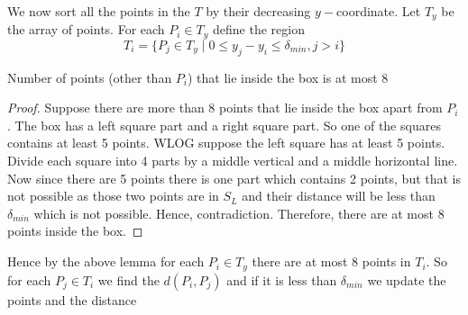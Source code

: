 We now sort all the points in the $T$ by their decreasing $y-$coordinate. Let $T_y$ be the array of points. For each $P_i\in T_y$ define the region $$T_i=\{P_j\in T_y \mid 0\leq y_j-y_i\leq \delta_{min}, j>i\}$$

\pagebreak
\begin{center}
	\begin{minipage}{0.7\textwidth}

		\begin{lemma}{}{}
			Number of points (other than $P_i$) that lie inside the box is at most 8
		\end{lemma}
		\begin{proof}
			Suppose there are more than 8 points that lie inside the box apart from $P_i$. The box has a left square part and a right square part. So one of the squares contains at least 5 points. WLOG suppose the left square has at least 5 points. Divide each square into 4 parts by a middle vertical and a middle horizontal line. Now since there are 5 points there is one part which contains 2 points, but that is not possible as those two points are in $S_L$ and their distance will be less than $\delta_{min}$ which is not possible. Hence, contradiction. Therefore, there are at most 8 points inside the box.
		\end{proof}\parinn

		Hence by the above lemma for each $P_i\in T_y$ there are at most 8 points in $T_i$. So for each $P_j\in T_i$ we find the $d(P_i,P_j)$ and if it is less than $\delta_{min}$ we update the points and the distance
	\end{minipage}
	\hspace{1cm}
	\begin{minipage}{0.229\textwidth}




		\begin{tikzpicture}[x=0.75pt,y=0.75pt,yscale=-1,xscale=1]


\end{tikzpicture}
\end{minipage}
\end{center}
